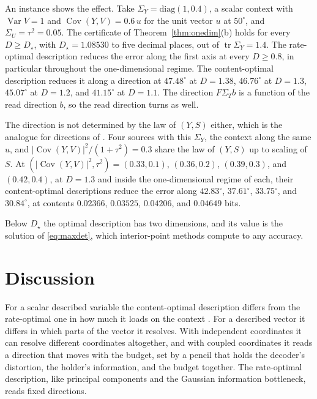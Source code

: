 \documentclass[11pt,onecolumn]{IEEEtran}
\newcommand{\tr}{\operatorname{tr}}
\newcommand{\Cov}{\operatorname{Cov}}
\begin{document}
An instance shows the effect. Take $\Sigma_Y=\mathrm{diag}(1,0.4)$, a
scalar context with $\operatorname{Var}V=1$ and $\Cov(Y,V)=0.6\,u$ for the
unit vector $u$ at $50^\circ$, and $\Sigma_U=\tau^2=0.05$. The certificate
of Theorem~\ref{thm:onedim}(b) holds for every $D\ge D_\star$, with
$D_\star=1.08530$ to five decimal places, out of $\tr\Sigma_Y=1.4$. The
rate-optimal description reduces the error along the first axis at every
$D\ge0.8$, in particular throughout the one-dimensional regime. The
content-optimal description reduces it along a direction at
$47.48^\circ$ at $D=1.38$, $46.76^\circ$ at $D=1.3$, $45.07^\circ$ at
$D=1.2$, and $41.15^\circ$ at $D=1.1$. The direction $F\Sigma_Tb$ is a function of
the read direction $b$, so the read direction turns as well.

The direction is not determined by the law of $(Y,S)$ either, which is
the analogue for directions of \cite[Corollary~21]{bond2026tit}. Four
sources with this $\Sigma_Y$, the context along the same $u$, and
$|\Cov(Y,V)|^2/(1+\tau^2)=0.3$ share the law of $(Y,S)$ up to scaling of
$S$. At $(|\Cov(Y,V)|^2,\tau^2)=(0.33,0.1)$, $(0.36,0.2)$, $(0.39,0.3)$,
and $(0.42,0.4)$, at $D=1.3$ and inside the one-dimensional regime of
each, their content-optimal descriptions reduce the error along
$42.83^\circ$, $37.61^\circ$, $33.75^\circ$, and $30.84^\circ$, at
contents $0.02366$, $0.03525$, $0.04206$, and $0.04649$ bits.

Below $D_\star$ the optimal description has two dimensions, and its value
is the solution of \eqref{eq:maxdet}, which interior-point methods compute
to any accuracy.

\section{Discussion}
\label{sec:discussion}

For a scalar described variable the content-optimal description differs
from the rate-optimal one in how much it loads on the context
\cite{bond2026tit}. For a described vector it differs in which parts of
the vector it resolves. With independent coordinates it can resolve
different coordinates altogether, and with coupled coordinates it reads a
direction that moves with the budget, set by a pencil that holds the
decoder's distortion, the holder's information, and the budget together.
The rate-optimal description, like principal components and the Gaussian
information bottleneck, reads fixed directions.
\end{document}
